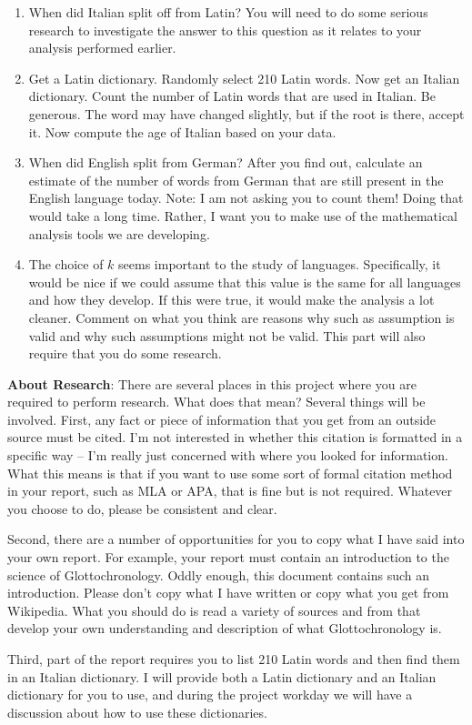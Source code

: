 \documentclass
[justified,nohyper]
{tufte-handout}
\begin{document}
\begin{enumerate}
  \item When did Italian split off from Latin? You will need to do some
  serious research to investigate the answer to this question as it relates
  to your analysis performed earlier.
  \item Get a Latin dictionary. Randomly select 210 Latin words. Now get an
  Italian dictionary. Count the number of Latin words that are used in Italian.
  Be generous. The word may have changed slightly, but if the root is there,
  accept it. Now compute the age of Italian based on your data.
  \item When did English split from German? After you find out, calculate an
  estimate of the number of words from German that are still present in the
  English language today. Note: I am not asking you to count them! Doing that
  would take a long time. Rather, I want you to make use of the mathematical
  analysis tools we are developing.
  \item The choice of $k$ seems important to the study of languages.
  Specifically, it would be nice if we could assume that this value is the
  same for all languages and how they develop. If this were true, it would make
  the analysis a lot cleaner. Comment on what you think are reasons why such
  as assumption is valid and why such assumptions might not be valid. This part
  will also require that you do some research.
\end{enumerate}

\textbf{About Research}: There are several places in this project where you are
required to perform research. What does that mean? Several things will be
involved. First, any fact or piece of information that you get from an outside
source must be cited. I'm not interested in whether this citation is formatted
in a specific way -- I'm really just concerned with where you looked for
information. What this means is that if you want to use some sort of formal
citation method in your report, such as MLA or APA, that is fine but is not
required. Whatever you choose to do, please be consistent and clear.

Second, there are a number of opportunities for you to copy what I have said
into your own report. For example, your report must contain an introduction to
the science of Glottochronology. Oddly enough, this document contains such an
introduction. Please don't copy what I have written or copy what you get from
Wikipedia. What you should do is read a variety of sources and from that develop
your own understanding and description of what Glottochronology is.

Third, part of the report requires you to list 210 Latin words and then find
them in an Italian dictionary. I will provide both a Latin dictionary and an
Italian dictionary for you to use, and during the project workday we will have
a discussion about how to use these dictionaries.
\end{document}
